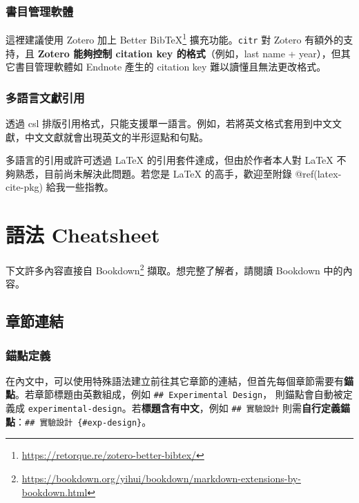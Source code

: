 \documentclass[oneside]{book}
\renewcommand{\href}[2]{#2\footnote{\url{#1}}}
\begin{document}
\hypertarget{ref-manager}{%
\subsection{書目管理軟體}\label{ref-manager}}

這裡建議使用 Zotero 加上 \href{https://retorque.re/zotero-better-bibtex/}{Better BibTeX} 擴充功能。\texttt{citr} 對 Zotero 有額外的支持，且 \textbf{Zotero 能夠控制 citation key 的格式}（例如，last name + year），但其它書目管理軟體如 Endnote 產生的 citation key 難以讀懂且無法更改格式。

\hypertarget{multi-lang-cite}{%
\subsection{多語言文獻引用}\label{multi-lang-cite}}

透過 csl 排版引用格式，只能支援單一語言。例如，若將英文格式套用到中文文獻，中文文獻就會出現英文的半形逗點和句點。

多語言的引用或許可透過 LaTeX 的引用套件達成，但由於作者本人對 LaTeX 不夠熟悉，目前尚未解決此問題。若您是 LaTeX 的高手，歡迎至附錄 @ref(latex-cite-pkg) 給我一些指教。

\hypertarget{cheatsheet}{%
\chapter{語法 Cheatsheet}\label{cheatsheet}}

下文許多內容直接自 \href{https://bookdown.org/yihui/bookdown/markdown-extensions-by-bookdown.html}{Bookdown} 擷取。想完整了解者，請閱讀 Bookdown 中的內容。

\hypertarget{chapter-cross-ref}{%
\section{章節連結}\label{chapter-cross-ref}}

\hypertarget{define-anchor}{%
\subsection{錨點定義}\label{define-anchor}}

在內文中，可以使用特殊語法建立前往其它章節的連結，但首先每個章節需要有\textbf{錨點}。若章節標題由英數組成，例如 \texttt{\#\#\ Experimental\ Design}， 則錨點會自動被定義成 \texttt{experimental-design}。若\textbf{標題含有中文}，例如 \texttt{\#\#\ 實驗設計} 則需\textbf{自行定義錨點}：\texttt{\#\#\ 實驗設計\ \{\#exp-design\}}。
\end{document}
